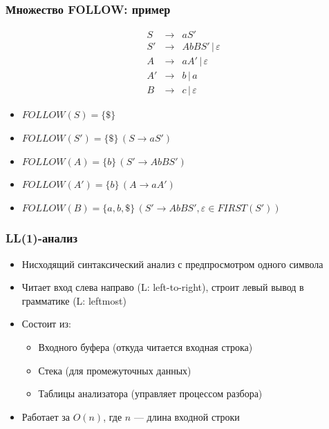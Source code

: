 \documentclass{beamer}
\begin{document}
\begin{frame}[fragile]
  \transwipe[direction=90]
  \frametitle{Множество FOLLOW: пример}
  $$
  \begin{array}{crcl}
  &S  & \rightarrow & a S' \\
  
  &S' & \rightarrow & A b B S' \, | \, \varepsilon \\
  
  &A  & \rightarrow & a A' \, | \, \varepsilon \\
  &A' & \rightarrow & b \, | \, a \\
  &B  & \rightarrow & c \, | \, \varepsilon  
  \end{array}
  $$ \pause
  
  \begin{itemize}
    \item $FOLLOW(S) = \{ \$ \}$ \pause
    \item $FOLLOW(S') = \{ \$ \} \, (S \rightarrow a S')$  \pause
    \item $FOLLOW(A) = \{ b \} \, (S' \rightarrow A b B S')$ \pause
    \item $FOLLOW(A') = \{ b \} \, (A \rightarrow a A')$ \pause
    \item $FOLLOW(B) = \{ a, b, \$ \} \, (S' \rightarrow A b B S', \varepsilon \in FIRST(S'))$ 
  \end{itemize}
\end{frame}

\begin{frame}[fragile]
  \transwipe[direction=90]
  \frametitle{LL(1)-анализ}
  \begin{itemize}
   \item Нисходящий синтаксический анализ с предпросмотром одного символа
   \item Читает вход слева направо (L: left-to-right), строит левый вывод в грамматике (L: leftmost)
   \item Состоит из:
   \begin{itemize}
     \item Входного буфера (откуда читается входная строка)
     \item Стека (для промежуточных данных)
     \item Таблицы анализатора (управляет процессом разбора)
   \end{itemize}
   \item Работает за $O(n)$, где $n$ --- длина входной строки
  \end{itemize}
\end{frame}
\end{document}
